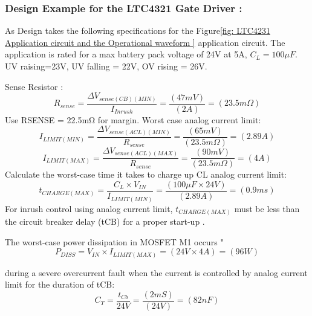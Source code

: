 \subsubsection{ Design Example for the LTC4321 Gate Driver :}
As Design takes the following specifications for the Figure\ref{fig: LTC4231 Application circuit and the Operational waveform } application circuit. The application is rated for a max battery pack voltage of 24V at 5A, $C_L=100\mu F$. UV raising=23V, UV falling = 22V, OV rising = 26V.

Sense Resistor :\\
\begin{equation}\label{eq:LTC_Rsense}
	R_{sense}  = \frac{\Delta V_{sense(CB)(MIN)}}{I_{Inrush}} = \frac{\left(47mV \right)}{\left(2A\right)} = \left(23.5m \Omega\right)
\end{equation}
Use RSENSE = 22.5mΩ for margin. Worst case analog current limit:\\
\begin{equation}\label{eq:LTC_Ilimit_min}
	I_{LIMIT(MIN)} = \frac{\Delta V_{sense(ACL)(MIN)}}{R_{sense}} = \frac{\left(65mV \right)}{\left(23.5m \Omega \right)} = \left(2.89A\right)
\end{equation}
\begin{equation}\label{eq:LTC_Ilimit_max}
	I_{LIMIT(MAX)} = \frac{\Delta V_{sense(ACL)(MAX)}}{R_{sense}} = \frac{\left(90mV \right)}{\left(23.5m \Omega \right)} = \left(4A\right)
\end{equation}
Calculate the worst-case time it takes to charge up CL analog current limit:\\
\begin{equation}\label{eq:LTC_Tcharge_max}
	t_{CHARGE(MAX)} = \frac{ C_{L}\times V_{IN}}{I_{LIMIT(MIN)}} = \frac{\left(100\mu F \times 24V \right)}{\left(2.89A \right)} = \left(0.9ms\right)
\end{equation}
For inrush control using analog current limit, $t_{CHARGE(MAX)}$ must be less than the circuit breaker delay (tCB) for a proper start-up \cite{LTC4231_User_Datasheet}.

The worst-case power dissipation in MOSFET M1 occurs "\\
\begin{equation}\label{eq:LTC_Pdissp}
	P_{DISS} = V_{IN} \times I_{LIMIT(MAX)}  = \left(24V \times 4A\right) = \left(96W\right)
\end{equation}

during a severe overcurrent fault when the current is controlled by analog current limit for the duration of tCB:
\begin{equation}\label{eq:LTC_Ct}
    C_{T} = \frac{ t_{Cb}}{24V} = \frac{\left(2mS \right)}{\left(24V \right)} = \left(82nF\right)
\end{equation}

